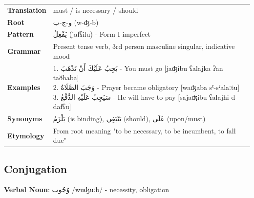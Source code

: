 \documentclass[letterpaper,12pt]{article}
\begin{document}
\begin{tabular}{p{3cm}p{10cm}}
\toprule
\textbf{Translation} & must / is necessary / should \\
\textbf{Root} & \textarabic{و-ج-ب} (w-ʤ-b) \\
\textbf{Pattern} & \textarabic{يَفْعِلُ} (jafʕilu) - Form I imperfect \\
\textbf{Grammar} & Present tense verb, 3rd person masculine singular, indicative mood \\
\midrule
\textbf{Examples} & \makecell[l]{\parbox{9.5cm}{
1. \textarabic{يَجِبُ عَلَيْكَ أَنْ تَذْهَبَ} - You must go [jaʤibu ʕalajka ʔan taðhaba]\\
2. \textarabic{وَجَبَ الصَّلَاةُ} - Prayer became obligatory [waʤaba sˤ-sˤalaːtu]\\
3. \textarabic{سَيَجِبُ عَلَيْهِ الدَّفْعُ} - He will have to pay [sajaʤibu ʕalajhi d-dafʕu]
}} \\
\midrule
\textbf{Synonyms} & \textarabic{يَلْزَمُ} (is binding), \textarabic{يَنْبَغِي} (should), \textarabic{عَلَى} (upon/must) \\
\textbf{Etymology} & From root meaning "to be necessary, to be incumbent, to fall due" \\
\bottomrule
\end{tabular}

\subsection{Conjugation}
\par{\large \textbf{Verbal Noun}: \textarabic{وُجُوب} /wuʤuːb/ - necessity, obligation}
\end{document}
